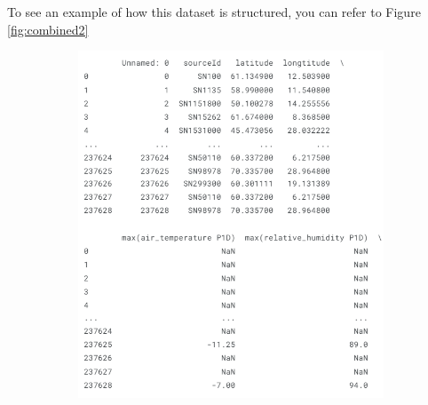 \documentclass[12pt]{article}
\begin{document}
To see an example of how this dataset is structured, you can refer to Figure \ref{fig:combined2}

\begin{figure}[h]
    \centering
    \begin{subfigure}{0.48\textwidth}
      \centering
      \includegraphics[width=\linewidth]{Nor1.png}
    \end{subfigure}
    \hfill
    \begin{subfigure}{0.48\textwidth}
      \centering

\end{subfigure}
\end{figure}
\end{document}
